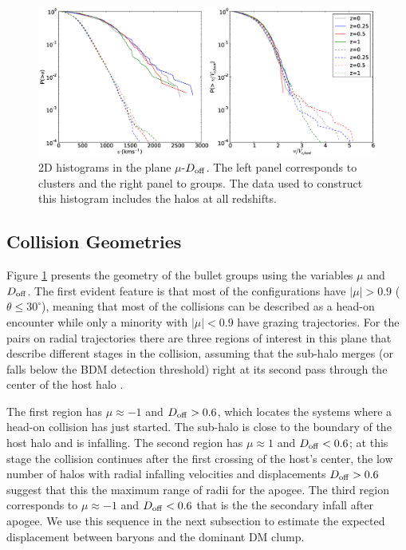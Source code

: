\documentclass{emulateapj}
\begin{document}
\begin{figure}
\begin{center}
\includegraphics[width=1.0\textwidth]{figure_3.eps}
\end{center}
\caption{2D histograms in the plane $\mu$-$D_{\rm off}$. The left
  panel corresponds to clusters and the right panel to groups. The data
  used to construct this histogram includes the halos at all redshifts.}
\label{fig:geometry}
\end{figure}





\subsection{Collision Geometries}
\label{sec:geometry}

Figure \ref{fig:geometry} presents the geometry of the bullet groups using the 
variables $\mu$ and $D_{\rm off}$. The first evident feature is that
most of the configurations have $|\mu|>0.9$ ($\theta\leq 30^{\circ}$),
meaning that most of the collisions can be described as a head-on
encounter while only a minority with $|\mu|<0.9$ have grazing
trajectories. For the pairs on radial trajectories there are three
regions of interest in this plane that describe different stages in
the collision, assuming that the sub-halo merges (or falls below the
BDM detection threshold) right at its second pass through the center
of the host halo \citep{Poole2006}.  


The first region has $\mu\approx-1$ and $D_{\rm off}>0.6$, which
locates the systems where a head-on collision has just started. The
sub-halo is close to the boundary of the host halo and is
infalling. The second region has $\mu\approx 1$ and $D_{\rm off}<0.6$;
at this stage the collision continues after the first crossing of the
host's center, the low number of halos with radial infalling velocities
and displacements $D_{\rm off}>0.6$ suggest that this the maximum
range of radii for the apogee.  The third region corresponds to
$\mu\approx-1$ and $D_{\rm off}<0.6$ that is the the
secondary infall after apogee. We use this sequence in the next
subsection to estimate the expected displacement between baryons and
the dominant DM clump. 
\end{document}

